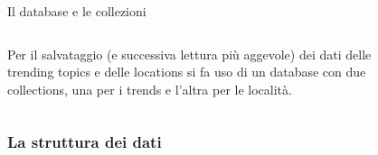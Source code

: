 \documentclass[xcolor=svgnames, aspectratio=169]{beamer}
\begin{document}
\begin{frame}{Il database e le collezioni}
    \begin{columns}[t]
        Per il salvataggio (e successiva lettura più aggevole) dei dati delle trending topics e delle locations si fa uso di un database con due collections, una per i trends e l'altra per le località.
        
        \vspace*{-32pt}
        \begin{figure}[H]
            \centering
            \noindent{}
        \end{figure}
    \end{columns}
\end{frame}


\subsubsection{La struttura dei dati}
\end{document}
